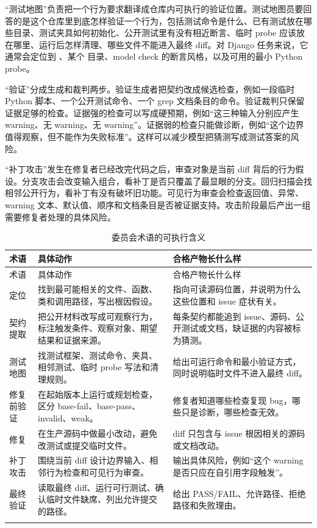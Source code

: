 \documentclass[UTF8,a4paper,11pt]{ctexart}
\begin{document}
“测试地图”负责把一个行为要求翻译成仓库内可执行的验证位置。测试地图员要回答的是这个仓库里到底怎样验证一个行为，包括测试命令是什么、已有测试放在哪些目录、测试夹具如何初始化、公开测试里有没有相近断言、临时 probe 应该放在哪里、运行后怎样清理、哪些文件不能进入最终 diff。对 Django 任务来说，它通常会定位到 、某个  目录、model check 的断言风格，以及可用的最小 Python probe。

“验证”分成生成和裁判两步。验证生成者把契约改成候选检查，例如一段临时 Python 脚本、一个公开测试命令、一个 grep 文档条目的命令。验证裁判只保留证据足够的检查。证据强的检查可以写成硬预期，例如“这三种输入分别应产生 warning、无 warning、无 warning”。证据弱的检查只能做诊断，例如“这个边界值得观察，但不能作为失败标准”。这样可以减少模型把猜测写成测试答案的风险。

“补丁攻击”发生在修复者已经改完代码之后，审查对象是当前 diff 背后的行为假设。分支攻击会改变输入组合，看补丁是否只覆盖了最显眼的分支。回归扫描会找相邻公开行为，看补丁有没有破坏旧功能。可见行为审查会检查返回值、异常、warning 文本、默认值、顺序和文档条目是否被证据支持。攻击阶段最后产出一组需要修复者处理的具体风险。

\begin{center}
{\small
\setlength{\tabcolsep}{3pt}
\begin{longtable}{L{3.0cm} L{5.4cm} L{5.8cm}}
\toprule
术语 & 具体动作 & 合格产物长什么样 \\
\midrule
\endfirsthead
\toprule
术语 & 具体动作 & 合格产物长什么样 \\
\midrule
\endhead
定位 & 找到最可能相关的文件、函数、类和调用路径，写出根因假设。 & 指向可读源码位置，并说明为什么这些位置和 issue 症状有关。 \\
契约提取 & 把公开材料改写成可观察行为，标注触发条件、观察对象、期望结果和证据来源。 & 每条契约都能追到 issue、源码、公开测试或文档，缺证据的内容被标为猜测。 \\
测试地图 & 找测试框架、测试命令、夹具、相邻测试、临时 probe 写法和清理规则。 & 给出可运行命令和最小验证方式，同时说明临时文件不进入最终 diff。 \\
修复前验证 & 在起始版本上运行或规划检查，区分 base-fail、base-pass、invalid、weak。 & 修复者知道哪些检查复现 bug，哪些只是诊断，哪些检查无效。 \\
修复 & 在生产源码中做最小改动，避免改测试或提交临时文件。 & diff 只包含与 issue 根因相关的源码或文档改动。 \\
补丁攻击 & 围绕当前 diff 设计边界输入、相邻行为检查和可见行为审查。 & 输出具体风险，例如“这个 warning 是否只应在自引用字段触发”。 \\
最终验证 & 读取最终 diff、运行可行测试、确认临时文件缺席、列出允许提交的路径。 & 给出 PASS/FAIL、允许路径、拒绝路径和失败理由。 \\
\bottomrule
\caption{委员会术语的可执行含义}
\end{longtable}
}
\end{center}
\end{document}
